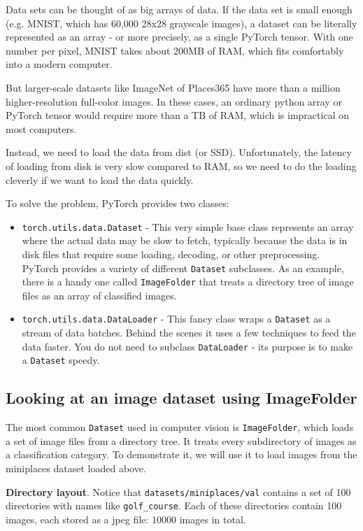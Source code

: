 Data sets can be thought of as big arrays of data. If the data set is small enough (e.g. MNIST, which has 60,000 28x28 grayscale images), a dataset can be literally represented as an array - or more precisely, as a single PyTorch tensor. With one number per pixel, MNIST takes about 200MB of RAM, which fits comfortably into a modern computer.

But larger-scale datasets like ImageNet of Places365 have more than a million higher-resolution full-color images. In these cases, an ordinary python array or PyTorch tensor would require more than a TB of RAM, which is impractical on most computers. 

Instead, we need to load the data from dist (or SSD). Unfortunately, the latency of loading from disk is very slow compared to RAM, so we need to do the loading cleverly if we want to load the data quickly. 

To solve the problem, PyTorch provides two classes:
\begin{itemize}
    \item \texttt{torch.utils.data.Dataset} - This very simple base class represents an array where the actual data may be slow to fetch, typically because the data is in disk files that require some loading, decoding, or other preprocessing. PyTorch provides a variety of different \texttt{Dataset} subclasses. As an example, there is a handy one called \texttt{ImageFolder} that treats a directory tree of image files as an array of classified images. 
    \item \texttt{torch.utils.data.DataLoader} - This fancy class wraps a \texttt{Dataset} as a stream of data batches. Behind the scenes it uses a few techniques to feed the data faster. You do not need to subclass \texttt{DataLoader} - its purpose is to make a \texttt{Dataset} speedy. 
\end{itemize}

\subsection{Looking at an image dataset using ImageFolder}

The most common \texttt{Dataset} used in computer vision is \texttt{ImageFolder}, which loads a set of image files from a directory tree. It treats every subdirectory of images as a classification category. To demonstrate it, we will use it to load images from the miniplaces dataset loaded above. 

\textbf{Directory layout}. Notice that \texttt{datasets/miniplaces/val} contains a set of 100 directories with names like \texttt{golf\_course}. Each of these directories contain 100 images, each stored as a jpeg file: 10000 images in total. 

